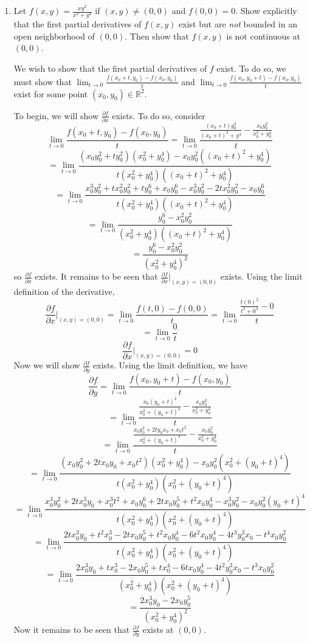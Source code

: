 \documentclass{article}
\begin{document}
\begin{enumerate}
\begin{enumerate}
        \item Let $f(x,y) = \frac{xy^2}{x^2 + y^4}$ if $( x,y) \neq (0,0)$ and $f(0,0) = 0$. Show explicitly that the first partial derivatives of $f(x,y)$ exist but are \textit{not} bounded in an open neighborhood of $(0,0)$. Then show that $f(x,y)$ is not continuous at $(0,0)$.
        \newline
        
        We wish to show that the first partial derivatives of $f$ exist. To do so, we must show that $\lim_{t \to 0} \frac{f(x_0 + t, y_0) - f(x_0, y_0)}{t}$ and $\lim_{t \to 0} \frac{f(x_0, y_0 + t) - f(x_0, y_0)}{t}$ exist for some point $(x_0, y_0) \in \mathbb{R}^2$. 
        
        To begin, we will show $\frac{\partial f}{\partial x}$ exists. To do so, consider
        \[\lim_{t \to 0} \frac{f(x_0 + t, y_0) - f(x_0, y_0)}{t} = \lim_{t \to 0} \frac{\frac{(x_0 + t)y_0^2}{(x_0 + t)^2 + y^4} - \frac{x_0 y_0^2}{x_0^2 + y_0^4}}{t}\]
        \[ = \lim_{t \to 0} \frac{(x_0y_0^2 + ty_0^2)(x_0^2 + y_0^4) - x_0y_0^2((x_0 + t)^2 + y_0^4)}{t(x_0^2 + y_0^4)((x_0+t)^2 + y_0^4)}\]
        \[ = \lim_{t \to 0} \frac{x_0^3y_0^2 + tx_0^2y_0^2 + ty_0^6 + x_0y_0^6 - x_0^3y_0^2 - 2tx_0^2y_0^2 - x_0y_0^6}{t(x_0^2 + y_0^4)((x_0 + t)^2 + y_0^4)}\]
        \[ = \lim_{t \to 0} \frac{y_0^6 - x_0^2y_0^2}{(x_0^2 + y_0^4)((x_0 + t)^2 + y_0^4)}\]
        \[ = \frac{y_0^6 - x_0^2y_0^2}{(x_0^2 + y_0^4)^2}\]
        so $\frac{\partial f}{\partial x}$ exists. It remains to be seen that $\frac{\partial f}{\partial x}|_{(x,y) = (0,0)}$ exists.
        Using the limit definition of the derivative, 
        \[\frac{\partial f}{\partial x} \bigg|_{(x,y) = (0,0)} = \lim_{t \to 0} \frac{f(t,0) - f(0,0)}{t} = \lim_{t \to 0} \frac{\frac{t(0)^2}{t^2 + 0^4} - 0}{t}\]
        \[ = \lim_{t \to 0} \frac{0}{t}\]
        \[\frac{\partial f}{\partial x}\bigg|_{(x,y) = (0,0)} = 0\]
        Now we will show $\frac{\partial f}{\partial y}$ exists. Using the limit definition, we have
        \[\frac{\partial f}{\partial y} = \lim_{t \to 0} \frac{f(x_0, y_0 + t) - f(x_0, y_0)}{t}\]
        \[= \lim_{t \to 0} \frac{\frac{x_0(y_0 + t)^2}{x_0^2 + (y_0 + t)^4} - \frac{x_0y_0^2}{x_0^2 + y_0^4}}{t}\]
        \[ = \lim_{t \to 0} \frac{\frac{x_0y_0^2 + 2ty_0x_0 + x_0t^2}{x_0^2 + (y_0 + t)^4} - \frac{x_0y_0^2}{x_0^2 + y_0^4}}{t}\]
        \[ = \lim_{t \to 0} \frac{(x_0y_0^2 + 2tx_0y_0 + x_0t^2)(x_0^2 + y_0^4) - x_0y_0^2(x_0^2 + (y_0 + t)^4)}{t(x_0^2 + y_0^4)(x_0^2 + (y_0 + t)^4)}\]
        \[ = \lim_{t \to 0} \frac{x_0^3y_0^2 + 2tx_0^3y_0 + x_0^3t^2 + x_0y_0^6 + 2tx_0y_0^5 + t^2x_0y_0^4 - x_0^3y_0^2 - x_0y_0^2(y_0 + t)^4}{t(x_0^2 + y_0^4)(x_0^2 + (y_0+t)^4)}\]
        \[ = \lim_{t \to 0} \frac{2tx_0^3y_0 + t^2x_0^3 - 2tx_0y_0^5 + t^2x_0y_0^4 - 6t^2x_0y_0^4 - 4t^3y_0^3x_0 - t^4x_0y_0^2}{t(x_0^2 + y_0^4)(x_0^2 + (y_0 + t)^4)}\]
        \[ = \lim_{t \to 0} \frac{2x_0^3y_0 + tx_0^3 - 2x_0y_0^5 + tx_0^4 - 6tx_0y_0^4 - 4t^2y_0^3x_0 - t^3x_0y_0^2 }{(x_0^2 + y_0^4)(x_0^2 + (y_0 + t)^4)}\]
        \[ = \frac{2x_0^3y_0 - 2x_0y_0^5}{(x_0^2 + y_0^4)^2}\]
        Now it remains to be seen that $\frac{\partial f}{\partial y}$ exists at $(0,0)$.
        

\end{enumerate}
\end{enumerate}
\end{document}
